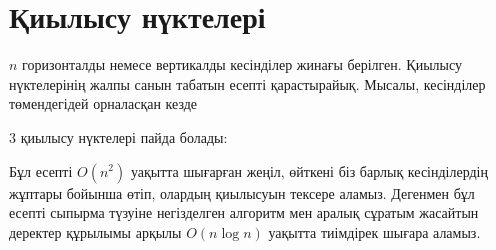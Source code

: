 
\section{Қиылысу нүктелері}


$n$ горизонталды немесе вертикалды кесінділер жинағы берілген. 
Қиылысу нүктелерінің жалпы санын табатын есепті қарастырайық. 
Мысалы, кесінділер төмендегідей орналасқан кезде
\begin{center}
\end{center}
3 қиылысу нүктелері пайда болады:
\begin{center}
\end{center}

Бұл есепті $O(n^2)$ уақытта шығарған жеңіл, өйткені
біз барлық кесінділердің жұптары бойынша өтіп, олардың қиылысуын
тексере аламыз. Дегенмен бұл есепті 
сыпырма түзуіне негізделген алгоритм мен аралық сұратым жасайтын
деректер құрылымы арқылы 
$O(n \log n)$ уақытта 
тиімдірек шығара аламыз.


